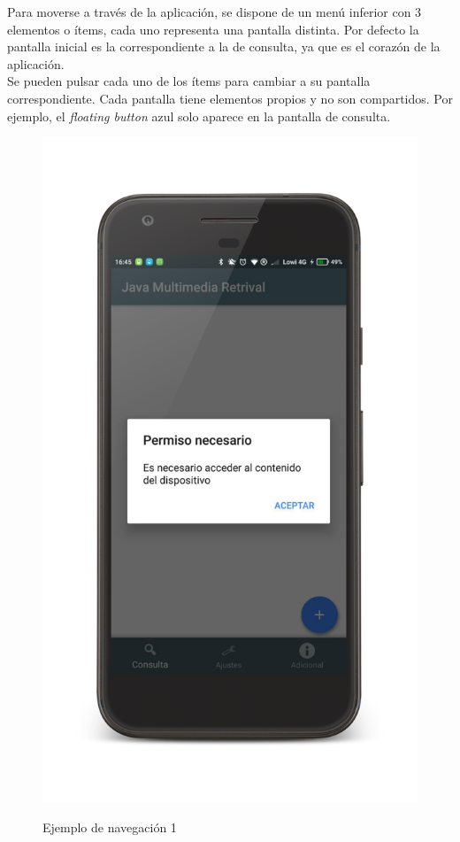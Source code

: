 Para moverse a través de la aplicación, se dispone de un menú inferior con 3 elementos o ítems, cada uno representa una pantalla distinta. Por defecto la pantalla inicial es la correspondiente a la de consulta, ya que es el corazón de la aplicación.\\

Se pueden pulsar cada uno de los ítems para cambiar a su pantalla correspondiente. Cada pantalla tiene elementos propios y no son compartidos. Por ejemplo, el \textit{floating button} azul solo aparece en la pantalla de consulta.\\

\begin{figure}[H] %
\centering
\includegraphics[scale=0.15]{imagenes/permisos2.png}  %
\label{permisos2.png}
\caption{Ejemplo de navegación 1}
\end{figure}

